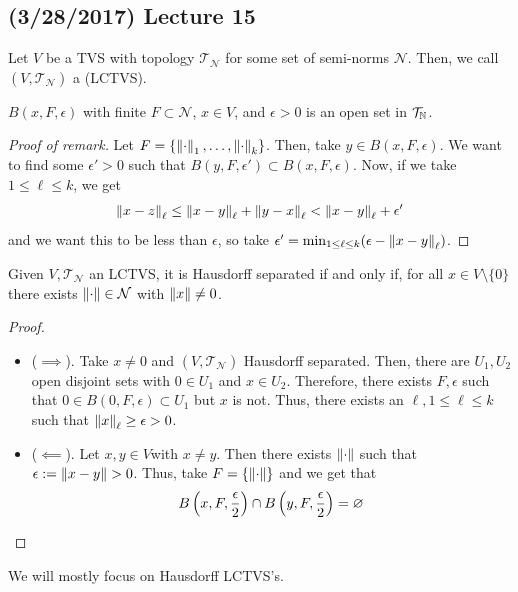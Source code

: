 \documentclass[11pt,leqno,oneside]{amsbook}
\numberwithin{thm}{section}
\newcommand{\Top}{\mathcal{T}} %
\newcommand{\cN}{\mathcal{N}}
\newcommand{\norms}{\cN}
\renewcommand{\emptyset}{\varnothing}
\begin{document}
\subsection*{(3/28/2017) Lecture 15}
\begin{defn}
  Let \(V\) be a TVS with topology \(\Top_\norms\) for some set of
  semi-norms \(\norms\). Then, we call \((V,\Top_\norms)\) a
   (LCTVS).
\end{defn}
\begin{rmk}
  \(B(x,F,\epsilon)\) with finite \(F \subset \norms\), \(x \in
  V\), and \(\epsilon > 0\) is an open set in \(\Top_\N\).
\end{rmk}
\begin{proof}[Proof of remark]
  Let \(F = \{\norm_1, \ldots, \norm_k\}\). Then, take \(y \in
  B(x,F,\epsilon)\). We want to find some \(\epsilon' > 0\) such that
  \(B(y,F,\epsilon') \subset B(x,F,\epsilon)\). Now, if we take \(1
  \leq \ell \leq k\), we get \[
    \norm[x-z]_\ell \leq \norm[x-y]_\ell + \norm[y-x]_\ell <
    \norm[x-y]_\ell + \epsilon'
  \]
  and we want this to be less than \(\epsilon\), so take \(\epsilon' =
  \min_{1 \leq \ell \leq k}(\epsilon - \norm[x-y]_\ell)\).
\end{proof}
\begin{prop}
  Given \(V,\Top_\norms\) an LCTVS, it is Hausdorff separated if and
  only if, for all \(x \in V \setminus \{0\}\) there exists \(\norm
  \in \norms\) with \(\norm[x] \neq 0\).
\end{prop}
\begin{proof}
  \begin{itemize}
  \item (\(\implies\)). Take \(x \neq 0\) and \((V,\Top_\norms)\)
    Hausdorff separated. Then, there are \(U_1,U_2\) open disjoint
    sets with \(0 \in U_1\) and \(x \in U_2\). Therefore, there exists
    \(F,\epsilon\) such that \(0 \in B(0,F,\epsilon) \subset U_1\) but
    \(x\) is not. Thus, there exists an \(\ell, 1 \leq \ell \leq k\)
    such that \(\norm[x]_\ell \geq \epsilon > 0\).
  \item (\(\impliedby\)). Let \(x,y \in V\)with \(x \neq y\). Then
    there exists \(\norm\) such that \(\epsilon := \norm[x-y] >
    0\). Thus, take \(F = \{\norm\}\) and we get that \[
      B\left(x,F,\frac{\epsilon}{2}\right) \intersect B\left(y,F,\frac{\epsilon}{2}\right) = \emptyset
    \]
  \end{itemize}
\end{proof}
We will mostly focus on Hausdorff LCTVS's.
\end{document}
